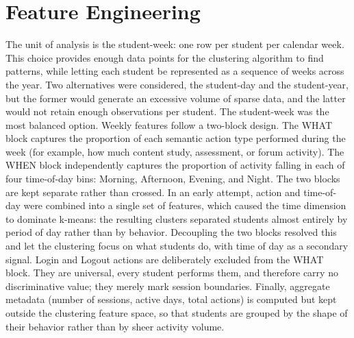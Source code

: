\section{Feature Engineering}
\label{sec:feature-engineering}
The unit of analysis is the student-week: one row per student per calendar week. This choice provides enough data points for the clustering algorithm to find patterns, while letting each student be represented as a sequence of weeks across the year. Two alternatives were considered, the student-day and the student-year, but the former would generate an excessive volume of sparse data, and the latter would not retain enough observations per student. The student-week was the most balanced option.
Weekly features follow a two-block design. The WHAT block captures the proportion of each semantic action type performed during the week (for example, how much content study, assessment, or forum activity). The WHEN block independently captures the proportion of activity falling in each of four time-of-day bins: Morning, Afternoon, Evening, and Night.
The two blocks are kept separate rather than crossed. In an early attempt, action and time-of-day were combined into a single set of features, which caused the time dimension to dominate k-means: the resulting clusters separated students almost entirely by period of day rather than by behavior. Decoupling the two blocks resolved this and let the clustering focus on what students do, with time of day as a secondary signal.
Login and Logout actions are deliberately excluded from the WHAT block. They are universal, every student performs them, and therefore carry no discriminative value; they merely mark session boundaries. Finally, aggregate metadata (number of sessions, active days, total actions) is computed but kept outside the clustering feature space, so that students are grouped by the shape of their behavior rather than by sheer activity volume.

